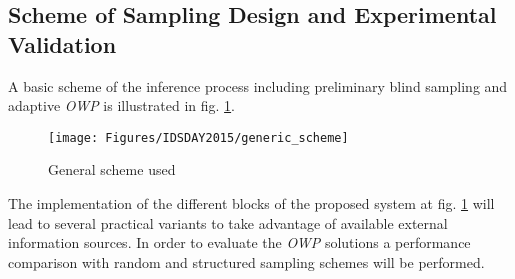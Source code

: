 \subsection{Scheme of Sampling Design and Experimental Validation}

A basic scheme of the inference process including preliminary blind sampling and adaptive \emph{OWP} is illustrated in fig. \ref{fig:gen_scheme}.

\begin{figure}
    \centering
    \texttt{[image: Figures/IDSDAY2015/generic\_scheme]}
	\caption{\label{fig:gen_scheme} General scheme used}
\end{figure}

The implementation of the different blocks of the proposed system at fig. \ref{fig:gen_scheme} will lead to several practical variants to take advantage of available external information sources. In order to evaluate the \emph{OWP} solutions a  performance comparison with random and structured sampling schemes will be performed.

